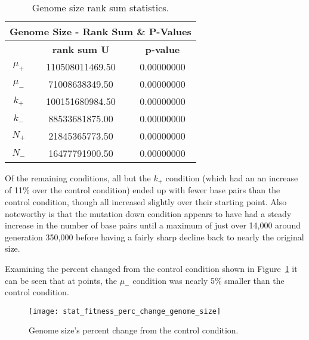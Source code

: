 \begin{table}[H]
	\centering
	\begin{tabular}{|c|c|c|}
		\hline
		\multicolumn{3}{c}{\Large Genome Size - Rank Sum \& P-Values} \\
		\hline
		& \textbf{rank sum U} & \textbf{p-value} \\
		\hline\hline
		$\mu_+$ & 110508011469.50 & 0.00000000 \\ 
		\hline
		$\mu_-$ & 71008638349.50 & 0.00000000 \\ 
		\hline
		$k_+$ & 100151680984.50 & 0.00000000 \\ 
		\hline
		$k_-$ & 88533681875.00 & 0.00000000 \\ 
		\hline
		$N_+$ & 21845365773.50 & 0.00000000 \\ 
		\hline
		$N_-$ & 16477791900.50 & 0.00000000 \\ 
		\hline
	\end{tabular}
	\caption[Genome size rank sum statistics]{Genome size rank sum statistics.}
	\label{table:genome_size_stats}
\end{table} 

Of the remaining conditions, all but the $k_+$ condition (which had an an increase of 11\% over the control condition) ended up with fewer base pairs than the control condition, though all increased slightly over their starting point. Also noteworthy is that the mutation down condition appears to have had a steady increase in the number of base pairs until a maximum of just over 14,000 around generation 350,000 before having a fairly sharp decline back to nearly the original size. 

Examining the percent changed from the control condition shown in Figure~\ref{fig:genome_size_percent_change} it can be seen that at points, the $\mu_-$ condition was nearly 5\% smaller than the control condition. 

\begin{figure}[H]
	\centering
	\texttt{[image: stat\_fitness\_perc\_change\_genome\_size]}
	\caption[Genome size - percent change]{Genome size's percent change from the control condition.}
	\label{fig:genome_size_percent_change}
\end{figure}


